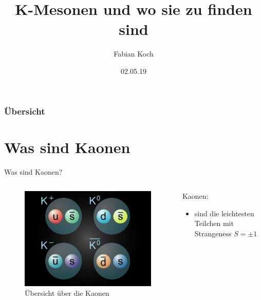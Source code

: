 \documentclass[aspectratio=1610, professionalfonts, 9pt, t]{beamer}
\title{K-Mesonen und wo sie zu finden sind}
\author[F.~Koch]{Fabian Koch}
\date{02.05.19}
\institute[Fakultät Physik ]{Fakultät Physik}
\begin{document}


\maketitle

\begin{frame}
  \frametitle{Übersicht}
  \tableofcontents
\end{frame}


\section{Was sind Kaonen}
  \begin{frame}{Was sind Kaonen?}
    \begin{columns}[onlytextwidth]
      \begin{column}{0.4\textwidth}
        \begin{figure}[ht]
          \begin{center}
            \includegraphics[height=0.6\textheight]{Images/Kaonen.png}
            \caption{Übersicht über die Kaonen}
          \end{center}
        \end{figure}
      \end{column}
      \begin{column}{0.5\textwidth}
        Kaonen:
        \begin{itemize}
          \item sind die leichtesten Teilchen mit Strangeness $S = \pm1$

\end{itemize}
\end{column}
\end{columns}
\end{frame}
\end{document}

